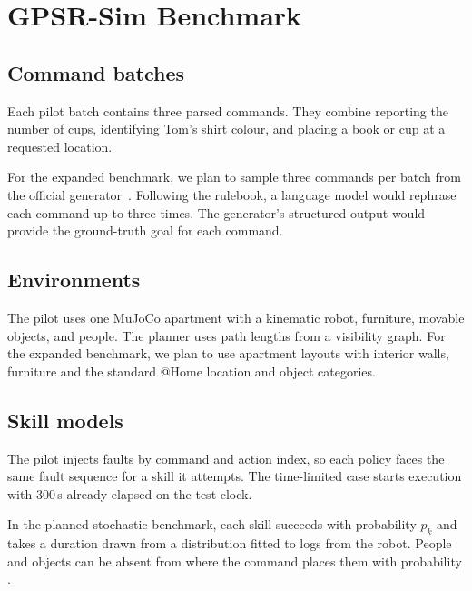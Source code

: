 \documentclass[conference]{IEEEtran}
\newcommand{\todo}[1]{}
\newcommand{\X}{}
\newcommand{\todo}[1]{\textcolor{red}{[TODO: #1]}}
\newcommand{\X}{\textcolor{red}{XX}}
\begin{document}
\section{GPSR-Sim Benchmark}\label{sec:bench}

\subsection{Command batches}
Each pilot batch contains three parsed commands. They combine reporting
the number of cups, identifying Tom's shirt colour, and placing a book
or cup at a requested location.

For the expanded benchmark, we plan to sample three commands per batch
from the official generator~\cite{cmdgen}. Following the rulebook, a
language model would rephrase each command up to three times.
\todo{Fix the rephrasing model and prompt.} The generator's structured
output would provide the ground-truth goal for each command.
\todo{Number of batches and train/test split if any parser tuning is done.}

\subsection{Environments}
The pilot uses one MuJoCo apartment with a kinematic robot, furniture,
movable objects, and people. The planner uses path lengths from a
visibility graph. For the expanded benchmark, we plan to use apartment
layouts with interior walls, furniture and the standard @Home location
and object categories. \todo{Choose source from hand-built arenas,
HSSD scenes via Habitat, or both. Compare the visibility graph with
occupancy-grid path lengths.}

\subsection{Skill models}
The pilot injects faults by command and action index, so each policy faces
the same fault sequence for a skill it attempts. The time-limited case
starts execution with 300\,s already elapsed on the test clock.

In the planned stochastic benchmark, each skill succeeds with probability
$p_k$ and takes a duration drawn from a distribution fitted to logs from
the robot. \todo{Collect logs and fit
$p_k$ and duration distributions per skill.} People and objects can be absent
from where the command places them with probability \X.
\end{document}
